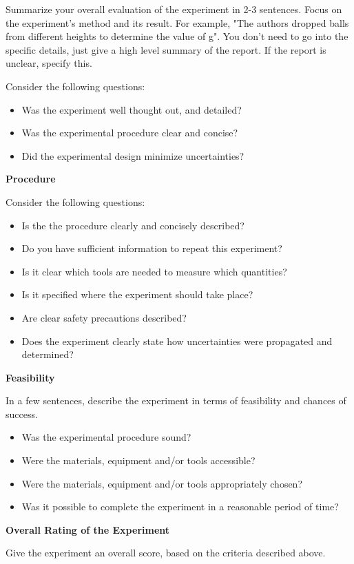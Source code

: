 Summarize your overall evaluation of the experiment in 2-3 sentences. Focus on the experiment's method and its result. For example, "The authors dropped balls from different heights to determine the value of g". You don't need to go into the specific details, just give a high level summary of the report. If the report is unclear, specify this.

Consider the following questions:
\begin{itemize}
\item Was the experiment well thought out, and detailed?
\item Was the experimental procedure clear and concise?
\item Did the experimental design minimize uncertainties?
\end{itemize}


\textbf{Procedure}

Consider the following questions:
\begin{itemize}
\item Is the the procedure clearly and concisely described? 
\item Do you have sufficient information to repeat this experiment?
\item Is it clear which tools are needed to measure which quantities?
\item Is it specified where the experiment should take place?
\item Are clear safety precautions described?
\item Does the experiment clearly state how uncertainties were propagated and determined?
\end{itemize}

\textbf{Feasibility}

In a few sentences, describe the experiment in terms of feasibility and chances of success. 

\begin{itemize}
\item Was the experimental procedure sound?
\item Were the materials, equipment and/or tools accessible? 
\item Were the materials, equipment and/or tools appropriately chosen?
\item Was it possible to complete the experiment in a reasonable period of time?
\end{itemize}


\textbf{Overall Rating of the Experiment}

Give the experiment an overall score, based on the criteria described above.

